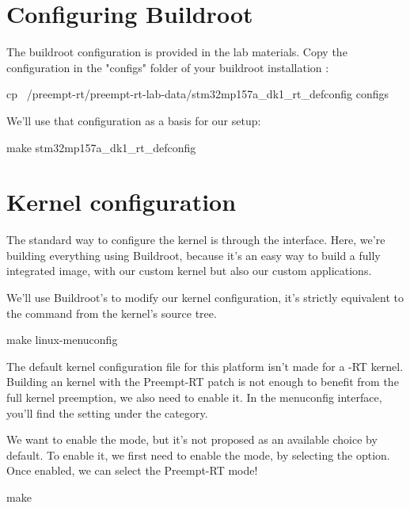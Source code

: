 \section{Configuring Buildroot}

The buildroot configuration is provided in the lab materials. Copy the configuration
in the "configs" folder of your buildroot installation :

\begin{bashinput}
        cp ~/preempt-rt/preempt-rt-lab-data/stm32mp157a_dk1_rt_defconfig configs
\end{bashinput}

We'll use that configuration as a basis for our setup:

\begin{bashinput}
make stm32mp157a_dk1_rt_defconfig
\end{bashinput}

\section{Kernel configuration}
The standard way to configure the kernel is through the  interface. Here, we're building everything using
Buildroot, because it's an easy way to build a fully integrated image, with our custom kernel but also our custom applications.

We'll use Buildroot's  to modify our kernel configuration,
it's strictly equivalent to the  command from the kernel's source tree.

\begin{bashinput}
        make linux-menuconfig
\end{bashinput}

The default kernel configuration file for this platform isn't made for a -RT kernel. Building an kernel with the Preempt-RT patch is not enough to
benefit from the full kernel preemption, we also need to enable it. In the menuconfig interface, you'll find the  setting under the  category.

We want to enable the  mode, but it's not proposed as an available choice by default. To enable it, we first need to enable the  mode, by selecting the  option. Once enabled, we can select the Preempt-RT mode!

\begin{bashinput}
make
\end{bashinput}

